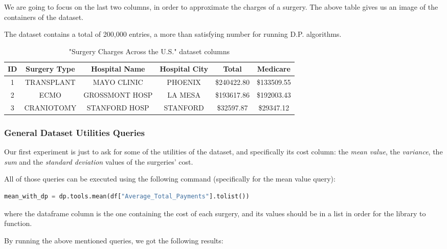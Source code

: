 We are going to focus on the last two columns, in order to approximate the charges of a surgery. The above table gives us an image of the containers of the dataset.

The dataset contains a total of 200,000 entries, a more than satisfying number for running D.P. algorithms.

\begin{table}[!htb]

    \caption{"Surgery Charges Across the U.S." dataset columns}
    \label{numbers}

    \begin{tabular}{| c | c | c | c | c| c |}
      \hline 
      ID & Surgery Type & Hospital Name & Hospital City & Total & Medicare \\
      \hline
      1 & TRANSPLANT & MAYO CLINIC & PHOENIX & \$240422.80 & \$133509.55\\
      \hline
      2 & ECMO &  GROSSMONT HOSP & LA MESA & \$193617.86 & \$192003.43 \\
      \hline
      3 & CRANIOTOMY & STANFORD HOSP &  STANFORD & \$32597.87 & \$29347.12  \\
      \hline
    \end{tabular}

\end{table}

\subsubsection{General Dataset Utilities Queries}

Our first experiment is just to ask for some of the utilities of the dataset, and specifically its cost column: the \emph{mean value}, the \emph{variance}, the \emph{sum} and the \emph{standard deviation} values of the surgeries' cost. 

All of those queries can be executed using the following command (specifically for the mean value query):
\bigskip

\begin{lstlisting}[language=Python]
mean_with_dp = dp.tools.mean(df["Average_Total_Payments"].tolist())
\end{lstlisting}
\bigskip

where the dataframe column is the one containing the cost of each surgery, and its values should be in a list in order for the library to function.

By running the above mentioned queries, we got the following results:


